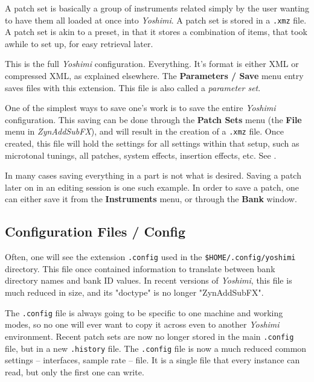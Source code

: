    A patch set is basically a group of instruments related simply by the user
   wanting to have them all loaded at once into \textsl{Yoshimi}.  A patch set
   is stored in a \texttt{.xmz} file.  A patch set is akin to a preset, in that
   it stores a combination of items, that took awhile to set up, for easy
   retrieval later.

   This is the full \textsl{Yoshimi} configuration. Everything.  It's format is
   either XML or compressed XML, as explained elsewhere.  The \textbf{Parameters
   / Save} menu entry saves files with this extension.  This file is also called
   a \textsl{parameter set}.

   One of the simplest ways to save one's work is to save the entire
   \textsl{Yoshimi} configuration.
   This saving can be done through the \textbf{Patch Sets} menu
   (the \textbf{File} menu in \textsl{ZynAddSubFX}),
   and will result in the creation of
   a \texttt{.xmz} file. Once created, this file will hold the settings for
   all settings within that setup, such as microtonal tunings, all
   patches, system effects, insertion effects, etc.
   See .

   In many cases saving everything in a part is not what is desired.
   Saving a patch later on in an editing session is one such example.
   In order to save a patch, one can either save it from the
   \textbf{Instruments} menu, or through the \textbf{Bank} window.

\subsection{Configuration Files / Config}
\label{subsec:configuration_config}

   Often, one will see the extension \texttt{.config} used in the
   \texttt{\$HOME/.config/yoshimi} directory.  This file once contained
   information to translate between bank directory names and bank ID
   values.  In recent versions of \textsl{Yoshimi}, this file is much
   reduced in size, and its "doctype" is no longer "ZynAddSubFX".

   The \texttt{.config} file is always going to be specific to one machine and
   working modes, so no one will ever want to copy it across even to another
   \textsl{Yoshimi} environment.  Recent patch sets are now no longer stored in
   the main \texttt{.config} file, but in a new \texttt{.history} file.  The
   \texttt{.config} file is now a much reduced common settings -- interfaces,
   sample rate -- file.  It is a single file that every instance can read, but
   only the first one can write.
   
